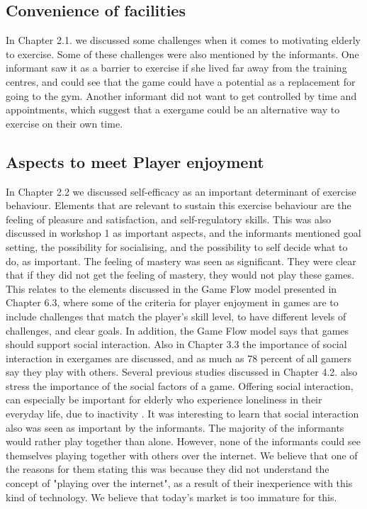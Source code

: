 \subsection{Convenience of facilities}
In Chapter 2.1. we discussed some challenges when it comes to motivating elderly to exercise. Some of these challenges were also mentioned by the informants. One informant saw it as a barrier to exercise if she lived far away from the training centres, and could see that the game could have a potential as a replacement for going to the gym. Another informant did not want to get controlled by time and appointments, which suggest that a exergame could be an alternative way to exercise on their own time. 


\subsection{Aspects to meet Player enjoyment}
In Chapter 2.2 we discussed self-efficacy as an important determinant of exercise behaviour. Elements that are relevant to sustain this exercise behaviour are the feeling of pleasure and satisfaction, and self-regulatory skills. This was also discussed in workshop 1 as important aspects, and the informants mentioned goal setting, the possibility for socialising, and the possibility to self decide what to do, as important. The feeling of mastery was seen as significant. They were clear that if they did not get the feeling of mastery, they would not play these games. This relates to the elements discussed in the Game Flow model presented in Chapter 6.3, where some of the criteria for player enjoyment in games are to include challenges that match the player's skill level, to have different levels of challenges, and clear goals. In addition, the Game Flow model says that games should support social interaction. Also in Chapter 3.3 the importance of social interaction in exergames are discussed, and  as much as 78 percent of all gamers say they play with others. Several previous studies discussed in Chapter 4.2. also stress the importance of the social factors of a game. Offering social interaction, can especially be important for elderly who experience loneliness in their everyday life, due to inactivity \cite{project}. It was interesting to learn that social interaction also was seen as important by the informants. The majority of the informants would rather play together than alone. However, none of the informants could see themselves playing together with others over the internet. We believe that one of the reasons for them stating this was because they did not understand the concept of "playing over the internet", as a result of their inexperience with this kind of technology. We believe that today's market is too immature for this. 

